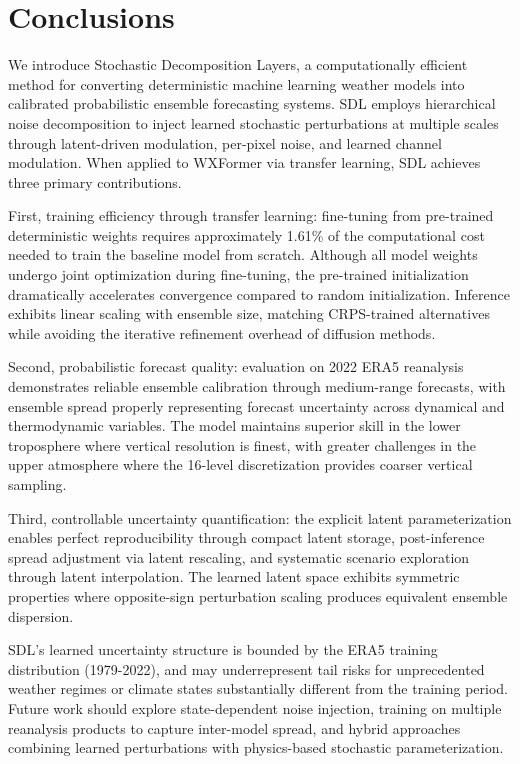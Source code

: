 \documentclass[11pt]{article}
\begin{document}
\section{Conclusions}

We introduce Stochastic Decomposition Layers, a computationally efficient method for converting deterministic machine learning weather models into calibrated probabilistic ensemble forecasting systems. SDL employs hierarchical noise decomposition to inject learned stochastic perturbations at multiple scales through latent-driven modulation, per-pixel noise, and learned channel modulation. When applied to WXFormer via transfer learning, SDL achieves three primary contributions.

First, training efficiency through transfer learning: fine-tuning from pre-trained deterministic weights requires approximately 1.61\% of the computational cost needed to train the baseline model from scratch. Although all model weights undergo joint optimization during fine-tuning, the pre-trained initialization dramatically accelerates convergence compared to random initialization. Inference exhibits linear scaling with ensemble size, matching CRPS-trained alternatives while avoiding the iterative refinement overhead of diffusion methods.

Second, probabilistic forecast quality: evaluation on 2022 ERA5 reanalysis demonstrates reliable ensemble calibration through medium-range forecasts, with ensemble spread properly representing forecast uncertainty across dynamical and thermodynamic variables. The model maintains superior skill in the lower troposphere where vertical resolution is finest, with greater challenges in the upper atmosphere where the 16-level discretization provides coarser vertical sampling.

Third, controllable uncertainty quantification: the explicit latent parameterization enables perfect reproducibility through compact latent storage, post-inference spread adjustment via latent rescaling, and systematic scenario exploration through latent interpolation. The learned latent space exhibits symmetric properties where opposite-sign perturbation scaling produces equivalent ensemble dispersion.

SDL's learned uncertainty structure is bounded by the ERA5 training distribution (1979-2022), and may underrepresent tail risks for unprecedented weather regimes or climate states substantially different from the training period. Future work should explore state-dependent noise injection, training on multiple reanalysis products to capture inter-model spread, and hybrid approaches combining learned perturbations with physics-based stochastic parameterization.
\end{document}
